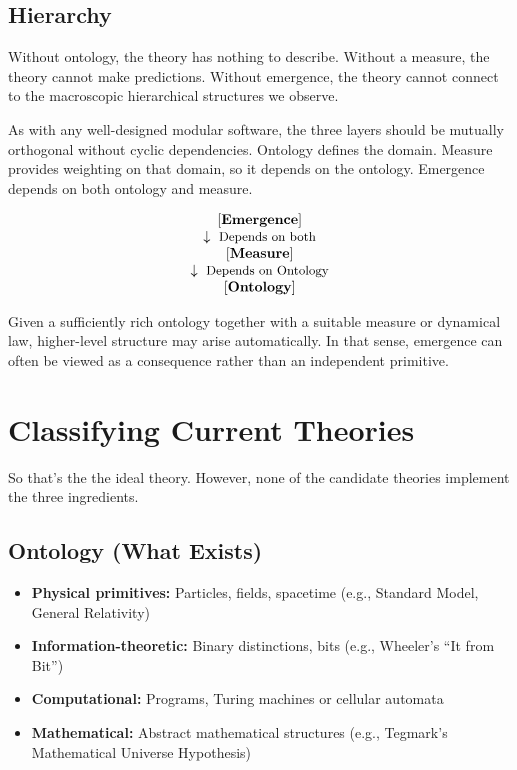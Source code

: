 \subsection*{Hierarchy}

Without ontology, the theory has nothing to describe. Without a measure, the theory cannot make predictions.
Without emergence, the theory cannot connect to the macroscopic hierarchical structures we observe.

As with any well-designed modular software, the three layers should be mutually orthogonal without cyclic dependencies.
Ontology defines the domain. Measure provides weighting on that domain, so it depends on the ontology.
Emergence depends on both ontology and measure. 

\[
\begin{array}{c}
\mathbf{[Emergence]} \\
\downarrow \ \text{\small{Depends on both}} \\
\mathbf{[Measure]} \\
\downarrow \ \text{\small{Depends on Ontology}} \\
\mathbf{[Ontology]} \\
\end{array}
\]

Given a sufficiently rich ontology together with a suitable measure or dynamical law, higher-level structure may arise automatically.
In that sense, emergence can often be viewed as a consequence rather than an independent primitive.


\section{Classifying Current Theories}

So that's the the ideal theory. However, none of the candidate theories implement the three ingredients. 

\subsection*{Ontology (What Exists)}
\begin{itemize}
    \item \textbf{Physical primitives:} Particles, fields, spacetime (e.g., Standard Model, General Relativity)
    \item \textbf{Information-theoretic:} Binary distinctions, bits (e.g., Wheeler's ``It from Bit'')
    \item \textbf{Computational:} Programs, Turing machines or cellular automata
    \item \textbf{Mathematical:} Abstract mathematical structures (e.g., Tegmark's Mathematical Universe Hypothesis)
\end{itemize}

